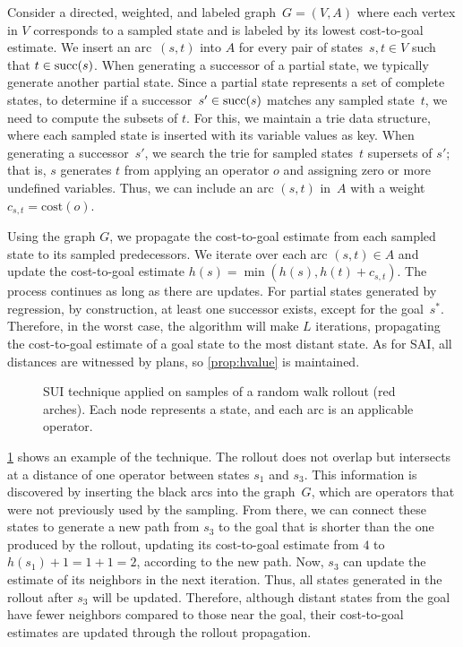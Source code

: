 
Consider a directed, weighted, and labeled graph~$G=(V,A)$ where each vertex in $V$ corresponds to a sampled state and is labeled by its lowest cost-to-goal estimate. We insert an arc~$(s,t)$ into $A$ for every pair of states~$s,t \in V$ such that $t \in \operatorname{succ}(s)$. When generating a successor of a partial state, we typically generate another partial state. Since a partial state represents a set of complete states, to determine if a successor~$s' \in \operatorname{succ}(s)$ matches any sampled state~$t$, we need to compute the subsets of $t$. For this, we maintain a trie data structure, where each sampled state is inserted with its variable values as key. When generating a successor~$s'$, we search the trie for sampled states~$t$ supersets of $s'$; that is, $s$ generates $t$ from applying an operator $o$ and assigning zero or more undefined variables. Thus, we can include an arc $(s, t)$ in~$A$ with a weight~$c_{s,t} = \text{cost}(o)$.

Using the graph $G$, we propagate the cost-to-goal estimate from each sampled state to its sampled predecessors. We iterate over each arc $(s,t) \in A$ and update the cost-to-goal estimate $h(s) = \min(h(s), h(t)+c_{s,t})$. The process continues as long as there are updates. For partial states generated by regression, by construction, at least one successor exists, except for the goal~$s^*$. Therefore, in the worst case, the algorithm will make $L$ iterations, propagating the cost-to-goal estimate of a goal state to the most distant state. As for SAI, all distances are witnessed by plans, so \cref{prop:hvalue} is maintained.

\begin{figure}[tb]
    \caption[SUI technique applied to samples of a random walk rollout.]{SUI technique applied on samples of a random walk rollout (red arches). Each node represents a state, and each arc is an applicable operator.}
    \label{fig:sui}
    \addmargin
    \centering
    
\end{figure}

\cref{fig:sui} shows an example of the technique. The rollout does not overlap but intersects at a distance of one operator between states $s_1$ and $s_3$. This information is discovered by inserting the black arcs into the graph~$G$, which are operators that were not previously used by the sampling. From there, we can connect these states to generate a new path from $s_3$ to the goal that is shorter than the one produced by the rollout, updating its cost-to-goal estimate from $4$ to $h(s_1)+1=1+1=2$, according to the new path. Now, $s_3$ can update the estimate of its neighbors in the next iteration. Thus, all states generated in the rollout after $s_3$ will be updated. Therefore, although distant states from the goal have fewer neighbors compared to those near the goal, their cost-to-goal estimates are updated through the rollout propagation.


